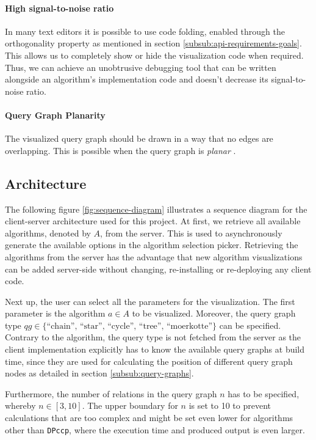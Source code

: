 \paragraph{High signal-to-noise ratio} 
In many text editors it is possible to use code folding, enabled
through the orthogonality property as mentioned in 
section \ref{subsub:api-requirements-goals}. This allows
us to completely show or hide the visualization code 
when required. Thus, we can achieve an unobtrusive
debugging tool that can be written alongside an 
algorithm's implementation code and doesn't decrease
its signal-to-noise ratio.

\paragraph{Query Graph Planarity}
The visualized query graph should be drawn in a way that no edges are overlapping. This is possible when the query graph is \textit{planar} \cite{trudeau2013introduction}.


\subsection{Architecture}

The following figure \ref{fig:sequence-diagram} illustrates a sequence diagram for the client-server architecture used for this project. At first, we retrieve all available algorithms, denoted by $A$, from the server. This is used to asynchronously generate the available options in the algorithm selection picker. Retrieving the algorithms from the server has the advantage that new algorithm visualizations can be added server-side without changing, re-installing or re-deploying any client code.

Next up, the user can select all the parameters for the visualization. The first parameter is the algorithm $a \in A$ to be visualized. Moreover, the query graph type $qg \in {\text{\{``chain'', ``star'', ``cycle'', ``tree'', ``moerkotte''\}}}$ can be specified. Contrary to the algorithm, the query type is not fetched from the server as the client implementation explicitly has to know the available query graphs at build time, since they are used for calculating the position of different query graph nodes as detailed in section \ref{subsub:query-graphs}. 

Furthermore, the number of relations in the query graph $n$ has to be specified, whereby $n \in [3,10]$. The upper boundary for $n$ is set to 10 to prevent calculations that are too complex and might be set even lower for algorithms other than \texttt{DPccp}, where the execution time and produced output is even larger.

